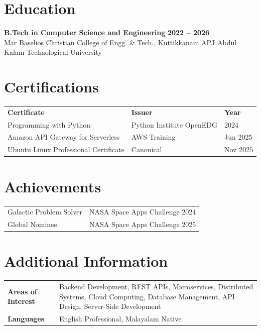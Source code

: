 \documentclass[10pt, a4paper]{article}
\begin{document}
\section*{Education}

\textbf{B.Tech in Computer Science and Engineering} \hfill \textbf{2022 -- 2026}\\
Mar Baselios Christian College of Engg. \& Tech., Kuttikkanam \hfill APJ Abdul Kalam Technological University

\section*{Certifications}

\renewcommand{\arraystretch}{1.0}
\begin{tabular}{@{} p{7.8cm} p{6.5cm} p{2.5cm} @{}}
\textbf{Certificate}                  & \textbf{Issuer}              & \textbf{Year} \\[1pt]
Programming with Python               & Python Institute OpenEDG   & 2024 \\
Amazon API Gateway for Serverless     & AWS Training                 & Jun 2025 \\
Ubuntu Linux Professional Certificate & Canonical                    & Nov 2025 \\
\end{tabular}

\section*{Achievements}

\begin{tabular}{@{} p{9.5cm} p{8cm} @{}}
Galactic Problem Solver              & NASA Space Apps Challenge 2024 \\
Global Nominee                       & NASA Space Apps Challenge 2025 \\
\end{tabular}

\section*{Additional Information}

\begin{tabular}{@{} >{\bfseries}p{3.8cm} p{13cm} @{}}
Areas of Interest & Backend Development, REST APIs, Microservices, Distributed Systems, Cloud Computing, Database Management, API Design, Server-Side Development \\
Languages         & English Professional, Malayalam Native \\
\end{tabular}
\end{document}
